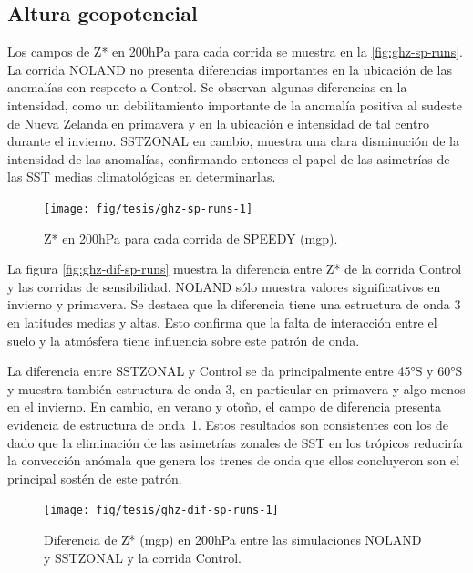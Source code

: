 \documentclass[spanish,a4paper,12pt,oneside]{book}
\begin{document}
\hypertarget{altura-geopotencial-2}{%
\subsection{Altura geopotencial}\label{altura-geopotencial-2}}

Los campos de Z* en 200hPa para cada corrida se muestra en la
\autoref{fig:ghz-sp-runs}. La corrida NOLAND no presenta diferencias
importantes en la ubicación de las anomalías con respecto a Control. Se
observan algunas diferencias en la intensidad, como un debilitamiento
importante de la anomalía positiva al sudeste de Nueva Zelanda en
primavera y en la ubicación e intensidad de tal centro durante el
invierno. SSTZONAL en cambio, muestra una clara disminución de la
intensidad de las anomalías, confirmando entonces el papel de las
asimetrías de las SST medias climatológicas en determinarlas.

\begin{landscape}\begin{figure}

{\centering \texttt{[image: fig/tesis/ghz-sp-runs-1]} 

}

\caption{Z* en 200hPa para cada corrida de SPEEDY (mgp).}\label{fig:ghz-sp-runs}
\end{figure}
\end{landscape}

La figura \autoref{fig:ghz-dif-sp-runs} muestra la diferencia entre Z*
de la corrida Control y las corridas de sensibilidad. NOLAND sólo
muestra valores significativos en invierno y primavera. Se destaca que
la diferencia tiene una estructura de onda 3 en latitudes medias y
altas. Esto confirma que la falta de interacción entre el suelo y la
atmósfera tiene influencia sobre este patrón de onda.

La diferencia entre SSTZONAL y Control se da principalmente entre 45°S y
60°S y muestra también estructura de onda 3, en particular en primavera
y algo menos en el invierno. En cambio, en verano y otoño, el campo de
diferencia presenta evidencia de estructura de onda~1. Estos resultados
son consistentes con los de \citet{Quintanar1995} dado que la
eliminación de las asimetrías zonales de SST en los trópicos reduciría
la convección anómala que genera los trenes de onda que ellos
concluyeron son el principal sostén de este patrón.

\begin{landscape}\begin{figure}

{\centering \texttt{[image: fig/tesis/ghz-dif-sp-runs-1]} 

}

\caption{Diferencia de Z* (mgp) en 200hPa entre las simulaciones NOLAND y SSTZONAL y la corrida Control.}\label{fig:ghz-dif-sp-runs}
\end{figure}
\end{landscape}
\end{document}
